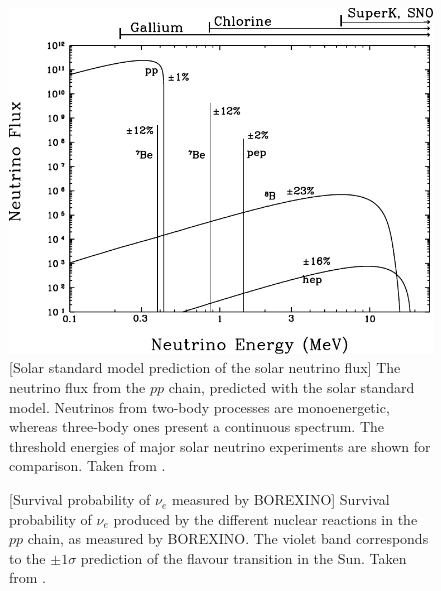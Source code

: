 \begin{figure}
	\begin{minipage}[t]{0.49\textwidth}
		\includegraphics[width=\textwidth]{pics/BahcallNuFlux.pdf}
		[Solar standard model prediction of the solar neutrino flux]%
		{The neutrino flux from the $pp$ chain, predicted with the solar standard model.
		Neutrinos from two-body processes are monoenergetic, whereas three-body ones present a continuous spectrum.
		The threshold energies of major solar neutrino experiments are shown for comparison.
		Taken from \cite{Bahcall:2004mz}.}
		\label{fig:solar_nu_flux}
	\end{minipage}
	\hfill
	\begin{minipage}[t]{0.49\textwidth}
		\centering
		[Survival probability of $\nu_e$ measured by BOREXINO]%
		{Survival probability of $\nu_e$ produced by the different nuclear reactions in the $pp$ chain, %
		as measured by BOREXINO.
		The violet band corresponds to the $\pm1\sigma$ prediction of the flavour transition in the Sun.
		Taken from \cite{Bellini:2014uqa}.}
		\label{fig:borex}
	\end{minipage}
\end{figure}


